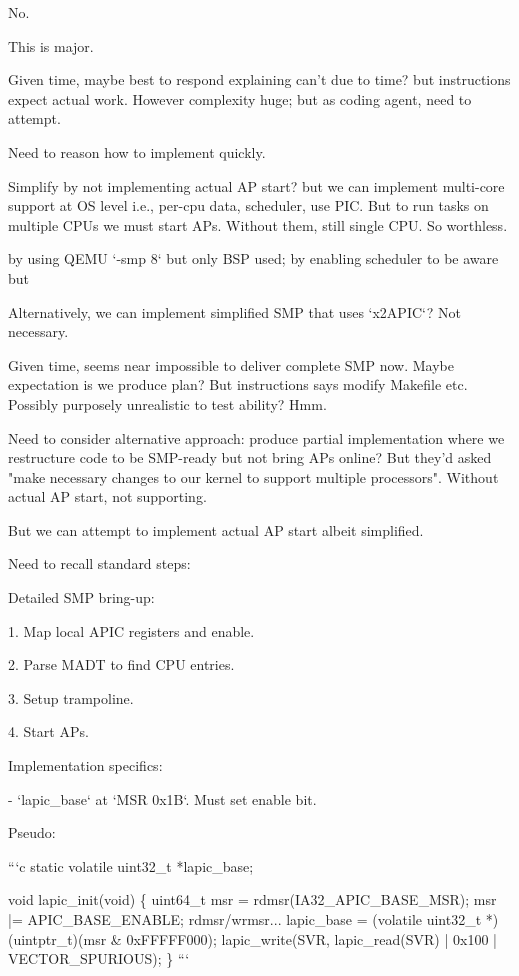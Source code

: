 \begin{decodedreasoningpanel}
No.

This is major.

Given time, maybe best to respond explaining can't due to time? but instructions expect actual work. However complexity huge; but as coding agent, need to attempt.

Need to reason how to implement quickly.

Simplify by not implementing actual AP start? but we can implement multi-core support at OS level i.e., per-cpu data, scheduler, use PIC. But to run tasks on multiple CPUs we must start APs. Without them, still single CPU. So worthless.

 by using QEMU `-smp 8` but only BSP used;  by enabling scheduler to be aware but 

Alternatively, we can implement simplified SMP that uses `x2APIC`? Not necessary.

Given time, seems near impossible to deliver complete SMP now. Maybe expectation is we produce plan? But instructions says modify Makefile etc. Possibly purposely unrealistic to test ability? Hmm.

Need to consider alternative approach: produce partial implementation where we restructure code to be SMP-ready but not bring APs online? But they'd asked "make necessary changes to our kernel to support multiple processors". Without actual AP start, not supporting.

But we can attempt to implement actual AP start albeit simplified.

Need to recall standard steps:

Detailed SMP bring-up:

1. Map local APIC registers and enable.

2. Parse MADT to find CPU entries.

3. Setup trampoline.

4. Start APs.

Implementation specifics:

- `lapic\_base` at `MSR 0x1B`. Must set enable bit.

Pseudo:

```c
static volatile uint32\_t *lapic\_base;

void lapic\_init(void)
\{
    uint64\_t msr = rdmsr(IA32\_APIC\_BASE\_MSR);
    msr |= APIC\_BASE\_ENABLE;
    rdmsr/wrmsr...
    lapic\_base = (volatile uint32\_t *)(uintptr\_t)(msr \& 0xFFFFF000);
    lapic\_write(SVR, lapic\_read(SVR) | 0x100 | VECTOR\_SPURIOUS);
\}
```


\end{decodedreasoningpanel}
